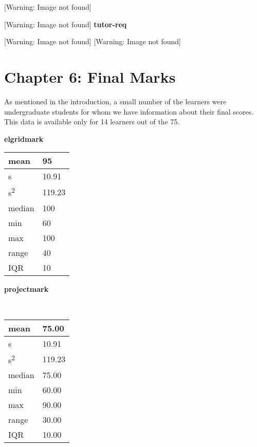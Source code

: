 \documentclass[12pt,twoside]{article}
\begin{document}
 [Warning: Image not found]  

 [Warning: Image not found]  
\textbf{tutor{}-req} 

 [Warning: Image not found]  
 [Warning: Image not found]  

\bigskip

\section[Chapter 6: Final Marks ]{Chapter 6: Final Marks }
\newline
As mentioned in the introduction, a small number of the learners were
undergraduate students for whom we have information about their final
scores.~ This data is available only for 14 learners out of the 75.

\textbf{elgridmark} 


\bigskip

\begin{longtable}[l]{|p{1.6712599in}|p{1.7309599in}|}
\hline
mean 
&
95 
\\\hline
s 
&
10.91 
\\\hline
s\textsuperscript{2} 
&
119.23 
\\\hline
median 
&
100 
\\\hline
min 
&
60 
\\\hline
max 
&
100 
\\\hline
range 
&
40 
\\\hline
IQR 
&
10 
\\\hline
\end{longtable}

\bigskip

\textbf{projectmark} 

~ 


\bigskip

\begin{longtable}[l]{|p{1.6712599in}|p{1.7309599in}|}
\hline
mean 
&
75.00
\\\hline
s 
&
10.91 
\\\hline
s\textsuperscript{2} 
&
119.23 
\\\hline
median 
&
75.00
\\\hline
min 
&
60.00
\\\hline
max 
&
90.00 
\\\hline
range 
&
30.00 
\\\hline
IQR 
&
10.00 
\\\hline
\end{longtable}
\end{document}
